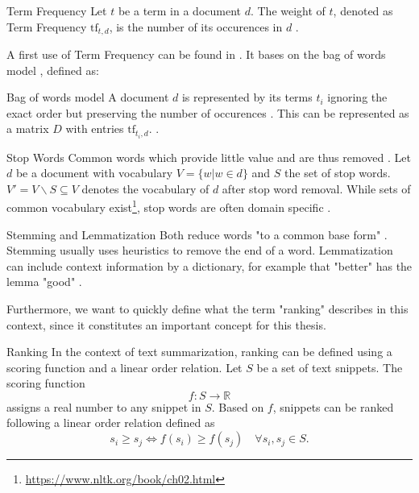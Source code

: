 \begin{definition}{Term Frequency}
\label{TF} Let $t$ be a term in a document $d$. The weight of $t$, denoted as Term Frequency $\text{tf}_{t,d}$, is the number of its occurences in $d$ \cite{Manning:2008:IIR:1394399}.
\end{definition}
A first use of Term Frequency can be found in \cite{Luhn:1957:SAM:1661832.1661836}. It bases on the bag of words model \cite{Manning:2008:IIR:1394399}, defined as:
\begin{definition}{Bag of words model} A document $d$ is represented by its terms $t_i$ ignoring the exact order but preserving the number of occurences \cite{Manning:2008:IIR:1394399}. This can be represented as a matrix $D$ with entries $\text{tf}_{t_i,d}$. \cite{DBLP:phd/dnb/Kling16}.
\end{definition}
\begin{definition}{Stop Words}
\label{STOP} Common words which provide little value and are thus removed \cite{Manning:2008:IIR:1394399}. Let $d$ be a document with vocabulary $V = \{ w | w \in d\}$ and $S$ the set of stop words. $V\prime = V \backslash S \subseteq V$ denotes the vocabulary of $d$ after stop word removal. While sets of common vocabulary exist\footnote{\url{https://www.nltk.org/book/ch02.html}}, stop words are often domain specific \cite{Manning:2008:IIR:1394399}.
\end{definition}
\begin{definition}{Stemming and Lemmatization} Both reduce words "to a common base form" \cite{Manning:2008:IIR:1394399}. Stemming usually uses heuristics to remove the end of a word. Lemmatization can include context information by a dictionary, for example that "better" has the lemma "good" \cite{Manning:2008:IIR:1394399, DBLP:conf/cikm/KoreniusLJJ04}.
\end{definition}
Furthermore, we want to quickly define what the term "ranking" describes in this context, since it constitutes an important concept for this thesis.
\begin{definition}{Ranking}
\label{rankingdef}
In the context of text summarization, ranking can be defined using a scoring function and a linear order relation.
Let $S$ be a set of text snippets. The scoring function
\begin{equation}
f: S \rightarrow \mathbb{R}
\end{equation} assigns a real number to any snippet in $S$.
Based on $f$, snippets can be ranked following a linear order relation defined as
\begin{equation}
s_i \geq s_j \Leftrightarrow f(s_i) \geq f(s_j) \quad \forall s_i, s_j \in S \text{.}
\end{equation}
\end{definition}
